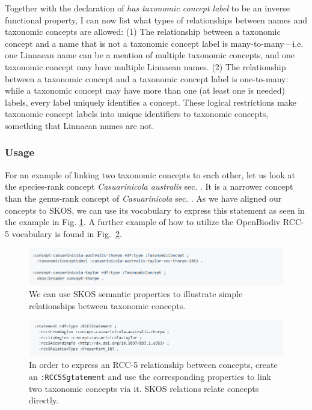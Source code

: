 Together with the declaration of \emph{has taxonomic concept label} to be an inverse functional property, I can now list what types of relationships between names and taxonomic concepts are allowed: (1) The relationship between a taxonomic concept and a name that is not a taxonomic concept label is many-to-many---i.e. one Linnaean name can be a mention of multiple taxonomic concepts, and one taxonomic concept may have multiple Linnaean names. (2) The relationship between a taxonomic concept and a taxonomic concept label is one-to-many: while a taxonomic concept may have more than one (at least one is needed) labels, every label uniquely identifies a concept. These logical restrictions make taxonomic concept labels into unique identifiers to taxonomic concepts, something that Linnaean names are not.

\subsubsection{Usage} For an example of linking two taxonomic concepts to each other, let us look at the species-rank concept \emph{Casuarinicola australis} \cite{taylor_casuarinicola_2010} sec. \cite{thorpe_casuarinicola_2013}. It is a narrower concept than the genus-rank concept of \emph{Casuarinicola} \cite{taylor_casuarinicola_2010} sec. \cite{taylor_casuarinicola_2010}. As we have aligned our concepts to SKOS, we can use its vocabulary to express this statement as seen in the example in Fig. \ref{example-simple-taxonomic-concept-relationships}. A further example of how to utilize the OpenBiodiv RCC-5 vocabulary is found in Fig.~\ref{example-rcc5-taxonomic-concept-relationships}.

\begin{figure}[h!]
\centering
  \includegraphics[width=\textwidth]{Figures/example-simple-taxonomic-concept-relationships}
  \decoRule
  \caption[Example simple taxonomic concept relationships.]
  {We can use SKOS semantic properties to illustrate simple relationships between taxonomic concepts.}
  \label{example-simple-taxonomic-concept-relationships}
\end{figure}

\begin{figure}[h!]
\centering
  \includegraphics[width=\textwidth]{Figures/example-rcc5-taxonomic-concept-relationships}
  \decoRule
  \caption[Example of RCC-5 taxonomic concept relationships.]{In order to express an RCC-5 relationship between concepts, create an {\tt :RCC5Sgtatement} and use the corresponding properties to link two taxonomic concepts via it. SKOS relations relate concepts directly.}
  \label{example-rcc5-taxonomic-concept-relationships}
\end{figure}

